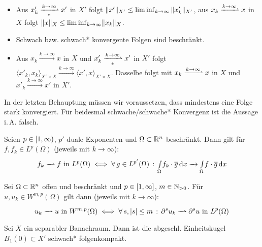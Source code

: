 \documentclass{cheat-sheet}
\newcommand{\IntO}[2]{\Int{\Omega}{}{#1}{#2}} %
\newcommand{\convWith}[1]{\xrightarrow{#1 \to \infty}} %
\newcommand{\convWeaklyWith}[1]{\xrightharpoonup{#1 \to \infty}} %
\newcommand{\convWeaklyStarWith}[1]{\xrightharpoonup[*]{#1 \to \infty}} %
\begin{document}
\begin{lem}
  \begin{itemize}
    \item Aus $x'_k \convWeaklyStarWith{k} x'$ in $X'$ folgt $\lVert x'\rVert_{X'} \leq \liminf_{k \to \infty} \|x'_k\|_{X'}$, aus $x_k \convWeaklyWith{k} x$ in $X$ folgt $\|x\|_X \leq \liminf_{k \to \infty} \lVert x_k\rVert_X$.
    \item Schwach bzw. schwach* konvergente Folgen sind beschränkt.
    \item Aus $x_k \convWith{k} x$ in $X$ und $x'_k \convWeaklyStarWith{k} x'$ in $X'$ folgt $\langle x'_k, x_k \rangle_{X' \times X} \convWith{k} \langle x', x \rangle_{X' \times X}$. Dasselbe folgt mit $x_k \convWeaklyWith{k} x$ in $X$ und $x'_k \convWith{k} x'$ in $X'$.
  \end{itemize}
\end{lem}

\begin{acht}
  In der letzten Behauptung müssen wir voraussetzen, dass mindestens eine Folge stark konvergiert. Für beidesmal schwache/schwache* Konvergenz ist die Aussage i.\,A. falsch.
\end{acht}

\begin{bsp}
  Seien $p \in \left[ 1, \infty \right)$, $p'$ duale Exponenten und $\Omega \subset \mathbb{R}^n$ beschränkt. Dann gilt für $f, f_k \in L^p(\Omega)$ (jeweils mit $k {\to} \infty$):
  \[ f_k \xrightharpoonup{\phantom{A}} f \text{ in } L^p(\Omega) \iff \fa{g \in L^{p'}(\Omega)} \IntO{f_k \cdot \overline{g}}{x} \xrightarrow{\phantom{A}} \IntO{f \cdot \overline{g}}{x} \]
\end{bsp}

\begin{bsp}
  Sei $\Omega \subset \mathbb{R}^n$ offen und beschränkt und $p \in \left[ 1, \infty \right]$, $m \in \mathbb{N}_{> 0}$. Für $u, u_k \in W^{m,p}(\Omega)$ gilt dann (jeweils mit $k {\to} \infty$):
  \[ u_k \xrightharpoonup{\phantom{A}} u \text{ in } W^{m,p}(\Omega) \iff \fa{s, \abs{s} \leq m} \partial^s u_k \xrightharpoonup{\phantom{A}} \partial^s u \text{ in } L^p(\Omega) \]
\end{bsp}

\begin{satz}
  Sei $X$ ein separabler Banachraum. Dann ist die abgeschl. Einheitskugel $\overline{B_1(0)} \subset X'$ schwach* folgenkompakt.
\end{satz}

\end{document}
